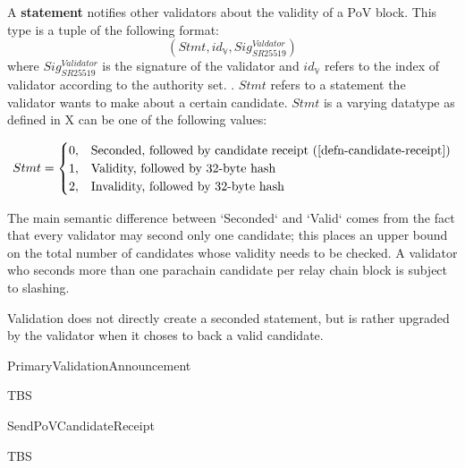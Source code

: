 \begin{definition}
  \label{defn-gossip-statement}
  A \textbf{statement} notifies other validators about the validity of a PoV block.
  This type is a tuple of the following format:
  \[
  (Stmt, id_{\mathbb{V}}, Sig^{Valdator}_{SR25519})
  \]
  where $Sig^{Validator}_{SR25519}$ is the signature of the validator and
  $id_{\mathbb{V}}$ refers to the index of validator according to the authority
  set. . $Stmt$
  refers to a statement the validator wants to make about a certain candidate.
  $Stmt$ is a varying datatype as defined in X  can be one
  of the following values:

\begin{equation}
  Stmt =
  \begin{cases}
    0, & \text{Seconded, followed by candidate receipt (\ref{defn-candidate-receipt})} \\
    1, & \text{Validity, followed by 32-byte hash} \\
    2, & \text{Invalidity, followed by 32-byte hash}
  \end{cases}
\end{equation}
\end{definition}

The main semantic difference between `Seconded` and `Valid` comes from the fact
that every validator may second only one candidate; this places an upper bound
on the total number of candidates whose validity needs to be checked. A
validator who seconds more than one parachain candidate per relay chain block is
subject to slashing.
\newline

Validation does not directly create a seconded statement, but is rather upgraded
by the validator when it choses to back a valid candidate.

\begin{algorithm}
  \caption[PrimaryValidationAnnouncement]{\sc PrimaryValidationAnnouncement}
  \label{algo-primary-validation-announcement}
  \begin{algorithmic}[1]
    \Require{}
     \State TBS
  \end{algorithmic}
\end{algorithm}

\begin{algorithm}
  \caption[]{\sc SendPoVCandidateReceipt}
  \label{algo-send-candidate-receipt}
  \begin{algorithmic}[1]
    \Require{}

    \State TBS
  \end{algorithmic}
\end{algorithm}

